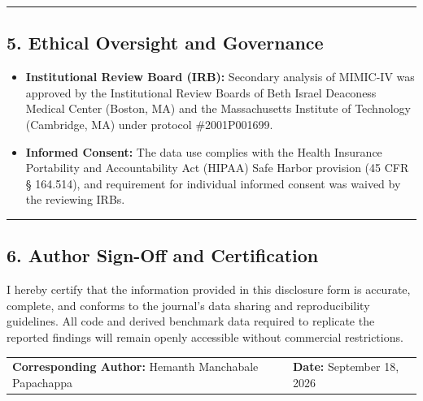 \documentclass[10pt, letterpaper]{article}
\begin{document}
\vspace{8pt}
\hrule
\vspace{8pt}

\subsection*{5. Ethical Oversight and Governance}

\begin{itemize}\setlength{\itemsep}{2pt}\setlength{\parskip}{0pt}
    \item \textbf{Institutional Review Board (IRB):} Secondary analysis of MIMIC-IV was approved by the Institutional Review Boards of Beth Israel Deaconess Medical Center (Boston, MA) and the Massachusetts Institute of Technology (Cambridge, MA) under protocol \#2001P001699.
    \item \textbf{Informed Consent:} The data use complies with the Health Insurance Portability and Accountability Act (HIPAA) Safe Harbor provision (45 CFR § 164.514), and requirement for individual informed consent was waived by the reviewing IRBs.
\end{itemize}

\vspace{10pt}
\hrule
\vspace{10pt}

\subsection*{6. Author Sign-Off and Certification}

I hereby certify that the information provided in this disclosure form is accurate, complete, and conforms to the journal's data sharing and reproducibility guidelines. All code and derived benchmark data required to replicate the reported findings will remain openly accessible without commercial restrictions.

\vspace{36pt}

\noindent
\begin{tabular*}{\textwidth}{@{\extracolsep{\fill}}ll}
    \textbf{Corresponding Author:} Hemanth Manchabale Papachappa & \textbf{Date:} September 18, 2026 \\
\end{tabular*}
\end{document}
